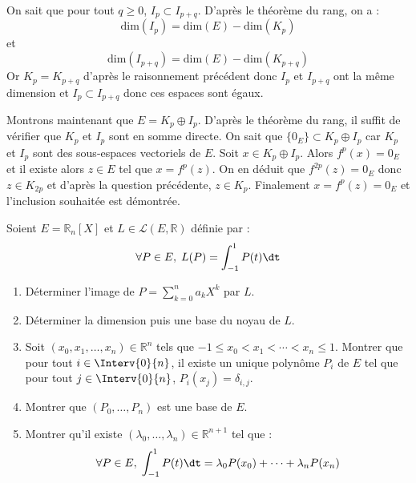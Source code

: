 \documentclass[a4paper,10pt]{report}
\begin{document}
\begin{enumerate}
\medskip

\noindent On sait que pour tout $q \geq 0$, $I_p \subset I_{p+q}$. D'après le théorème du rang, on a :
$$ \textrm{dim}(I_p) = \textrm{dim}(E) - \textrm{dim}(K_p)$$
et 
$$ \textrm{dim}(I_{p+q}) = \textrm{dim}(E) - \textrm{dim}(K_{p+q})$$
Or $K_p = K_{p+q}$ d'après le raisonnement précédent donc $I_p$ et $I_{p+q}$ ont la même dimension et $I_p \subset I_{p+q}$ donc ces espaces sont égaux.

\medskip

\noindent Montrons maintenant que $E = K_p \oplus I_p$. D'après le théorème du rang, il suffit de vérifier que $K_p$ et $I_p$ sont en somme directe. On sait que $\lbrace 0_E \rbrace \subset  K_p \oplus I_p$ car $K_p$ et $I_p$ sont des sous-espaces vectoriels de $E$. Soit $x \in  K_p \oplus I_p$. Alors $f^p(x)=0_E$ et il existe alors $z \in E$ tel que $x=f^p(z)$. On en déduit que $f^{2p}(z)=0_E$ donc $z \in K_{2p}$ et d'après la question précédente, $z \in K_p$. Finalement $x=f^p(z)=0_E$ et l'inclusion souhaitée est démontrée.

\end{enumerate}


\begin{Exa} Soient $E= \mathbb{R}_n[X]$ et $L \in \mathcal{L}(E, \mathbb{R})$ définie par :
$$ \forall P \in E, \;  L(P) = \int_{-1}^1 P(t) \dt$$
\begin{enumerate}
\item Déterminer l'image de $P= \sum_{k=0}^n a_k X^k$ par $L$.
\item Déterminer la dimension puis une base du noyau de $L$.
\item Soit $(x_0, x_1, \ldots, x_n) \in \mathbb{R}^n$ tels que $-1 \leq x_0 < x_1 < \cdots < x_n \leq 1$. Montrer que pour tout $i \in \Interv{0}{n}$, il existe un unique polynôme $P_i$ de $E$ tel que pour tout $j \in \Interv{0}{n}$, $P_i(x_j)= \delta_{i,j}$.
\item Montrer que $(P_0, \ldots, P_n)$ est une base de $E$.
\item Montrer qu'il existe $(\lambda_0, \ldots, \lambda_n) \in \mathbb{R}^{n+1}$ tel que :
$$ \forall P \in E, \; \int_{-1}^1 P(t) \dt = \lambda_0 P(x_0) + \cdots + \lambda_n P(x_n)$$
\end{enumerate}
\end{Exa}
\end{document}
